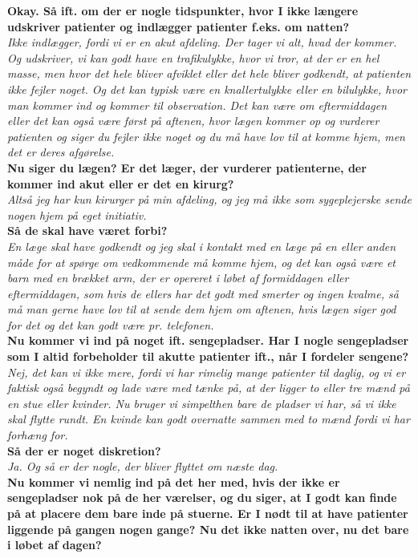 \noindent
\textbf{Okay. Så ift. om der er nogle tidspunkter, hvor I ikke længere udskriver patienter og indlægger patienter f.eks. om natten?}\\
\noindent
\textit{Ikke indlægger, fordi vi er en akut afdeling. Der tager vi alt, hvad der kommer. Og udskriver, vi kan godt have en trafikulykke, hvor vi tror, at der er en hel masse, men hvor det hele bliver afviklet eller det hele bliver godkendt, at patienten ikke fejler noget. Og det kan typisk være en knallertulykke eller en bilulykke, hvor man kommer ind og kommer til observation. Det kan være om eftermiddagen eller det kan også være først på aftenen, hvor lægen kommer op og vurderer patienten og siger du fejler ikke noget og du må have lov til at komme hjem, men det er deres afgørelse.}\\
\noindent
\textbf{Nu siger du lægen? Er det læger, der vurderer patienterne, der kommer ind akut eller er det en kirurg?}\\
\noindent
\textit{Altså jeg har kun kirurger på min afdeling, og jeg må ikke som sygeplejerske sende nogen hjem på eget initiativ.}\\
\noindent
\textbf{Så de skal have været forbi?}\\
\noindent
\textit{En læge skal have godkendt og jeg skal i kontakt med en læge på en eller anden måde for at spørge om vedkommende må komme hjem, og det kan også være et barn med en brækket arm, der er opereret i løbet af formiddagen eller eftermiddagen, som hvis de ellers har det godt med smerter og ingen kvalme, så må man gerne have lov til at sende dem hjem om aftenen, hvis lægen siger god for det og det kan godt være pr. telefonen.}\\
\noindent
\textbf{Nu kommer vi ind på noget ift. sengepladser. Har I nogle sengepladser som I altid forbeholder til akutte patienter ift., når I fordeler sengene?}\\
\noindent
\textit{ Nej, det kan vi ikke mere, fordi vi har rimelig mange patienter til daglig, og vi er faktisk også begyndt og lade være med tænke på, at der ligger to eller tre mænd på en stue eller kvinder. Nu bruger vi simpelthen bare de pladser vi har, så vi ikke skal flytte rundt. En kvinde kan godt overnatte sammen med to mænd fordi vi har forhæng for.}\\
\noindent
\textbf{Så der er noget diskretion?}\\
\noindent
\textit{Ja. Og så er der nogle, der bliver flyttet om næste dag.}\\
\noindent
\textbf{Nu kommer vi nemlig ind på det her med, hvis der ikke er sengepladser nok på de her værelser, og du siger, at I godt kan finde på at placere dem bare inde på stuerne. Er I nødt til at have patienter liggende på gangen nogen gange? Nu det ikke natten over, nu det bare i løbet af dagen?}\\
